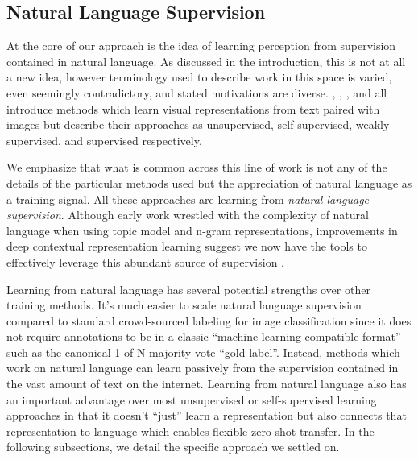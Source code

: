 \documentclass{article}
\begin{document}
\subsection{Natural Language Supervision}

At the core of our approach is the idea of learning perception from supervision contained in natural language. As discussed in the introduction, this is not at all a new idea, however terminology used to describe work in this space is varied, even seemingly contradictory, and stated motivations are diverse. \citet{zhang2020contrastive}, \citet{gomez2017self}, \citet{joulin2016learning}, and \citet{desai2020virtex} all introduce methods which learn visual representations from text paired with images but describe their approaches as unsupervised, self-supervised, weakly supervised, and supervised respectively.

We emphasize that what is common across this line of work is not any of the details of the particular methods used but the appreciation of natural language as a training signal. All these approaches are learning from \textit{natural language supervision}. Although early work wrestled with the complexity of natural language when using topic model and n-gram representations, improvements in deep contextual representation learning suggest we now have the tools to effectively leverage this abundant source of supervision \citep{mccann2017learned}.



Learning from natural language has several potential strengths over other training methods. It's much easier to scale natural language supervision compared to standard crowd-sourced labeling for image classification since it does not require annotations to be in a classic ``machine learning compatible format'' such as the canonical 1-of-N majority vote ``gold label''. Instead, methods which work on natural language can learn passively from the supervision contained in the vast amount of text on the internet. Learning from natural language also has an important advantage over most unsupervised or self-supervised learning approaches in that it doesn't ``just'' learn a representation but also connects that representation to language which enables flexible zero-shot transfer. In the following subsections, we detail the specific approach we settled on.
\end{document}
